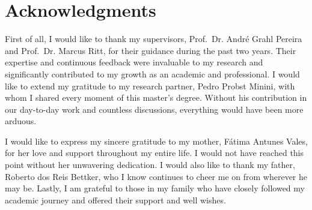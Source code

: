 \chapter*{Acknowledgments}

First of all, I would like to thank my supervisors, Prof.~Dr. Andr{\'e} Grahl Pereira and Prof.~Dr. Marcus Ritt, for their guidance during the past two years. Their expertise and continuous feedback were invaluable to my research and significantly contributed to my growth as an academic and professional.
I would like to extend my gratitude to my research partner, Pedro Probst Minini, with whom I shared every moment of this master's degree. Without his contribution in our day-to-day work and countless discussions, everything would have been more arduous.

I would like to express my sincere gratitude to my mother, F{\'a}tima Antunes Vales, for her love and support throughout my entire life. I would not have reached this point without her unwavering dedication.
I would also like to thank my father, Roberto dos Reis Bettker, who I know continues to cheer me on from wherever he may be.
Lastly, I am grateful to those in my family who have closely followed my academic journey and offered their support and well wishes.
